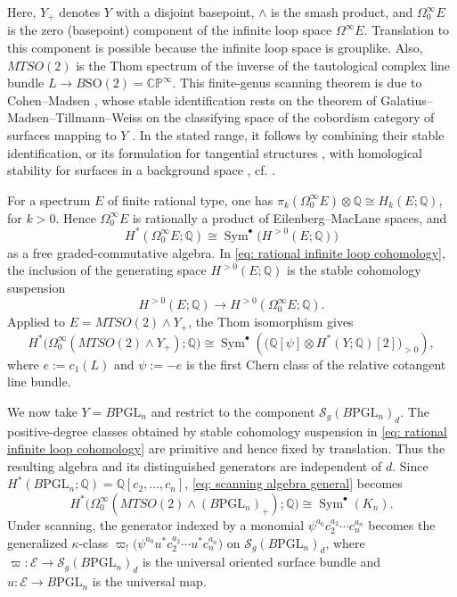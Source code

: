 \documentclass[11pt,reqno]{amsart}
\theoremstyle{plain} %
\theoremstyle{definition}
\newcommand{\QQ}{\mathbb{Q}}
\newcommand{\CC}{\mathbb{C}}
\newcommand{\PP}{\mathbb{P}}
\newcommand{\BPGL}{B\mathrm{PGL}}
\newcommand{\BSO}{B\mathrm{SO}}
\DeclareMathOperator{\Sym}{Sym}
\newcommand{\Sc}{\mathcal{S}}
\begin{document}
\noindent Here, $Y_+$ denotes $Y$ with a disjoint basepoint, $\wedge$ is the smash product, and $\Omega^\infty_0E$ is the zero (basepoint) component of the infinite loop space $\Omega^\infty E$. Translation to this component is possible because the infinite loop space is grouplike. Also, $MTSO(2)$ is the Thom spectrum of the inverse of the tautological complex line bundle $L \to \BSO(2)=\CC\PP^\infty$. This finite-genus scanning theorem is due to Cohen--Madsen \cite[Theorems~0.1 and~0.3]{cohen2006surfaces}, whose stable identification rests on the theorem of Galatius--Madsen--Tillmann--Weiss on the classifying space of the cobordism category of surfaces mapping to $Y$ \cite[\S 5]{GMTW}. In the stated range, it follows by combining their stable identification, or its formulation for tangential structures \cite[Corollary~F]{GRW-monoids}, with homological stability for surfaces in a background space \cite[\S 7.4]{RW-resolutions}, cf. \cite[Theorem~4.17]{boldsen}.

For a spectrum $E$ of finite rational type, one has $\pi_k(\Omega^\infty_0E)\otimes\QQ \cong H_k(E;\QQ)$, for $k > 0$. Hence $\Omega^\infty_0E$ is rationally a product of Eilenberg--MacLane spaces, and
\begin{equation} \label{eq: rational infinite loop cohomology}
H^*(\Omega^\infty_0E;\QQ) \cong \Sym^\bullet\big(H^{>0}(E;\QQ)\big)
\end{equation}
as a free graded-commutative algebra. In \eqref{eq: rational infinite loop cohomology}, the inclusion of the generating space $H^{>0}(E;\QQ)$ is the stable cohomology suspension
\[
H^{>0}(E;\QQ)\longrightarrow H^{>0}(\Omega^\infty_0E;\QQ).
\]
Applied to $E=MTSO(2)\wedge Y_+$, the Thom isomorphism gives
\begin{equation} \label{eq: scanning algebra general}
H^*\big(\Omega^\infty_0(MTSO(2)\wedge Y_+);\QQ\big)
\cong
\Sym^\bullet\!\left(\big(\QQ[\psi]\otimes H^*(Y;\QQ)[2]\big)_{>0}\right),
\end{equation}
where $e:=c_1(L)$ and $\psi:=-e$ is the first Chern class of the relative cotangent line bundle. 


We now take $Y=\BPGL_n$ and restrict to the component $\Sc_g(\BPGL_n)_d$. The positive-degree classes obtained by stable cohomology suspension in \eqref{eq: rational infinite loop cohomology} are primitive and hence fixed by translation. Thus the resulting algebra and its distinguished generators are independent of $d$. Since $H^*(\BPGL_n;\QQ)=\QQ[c_2,\dots,c_n]$, \eqref{eq: scanning algebra general} becomes
\begin{equation} \label{eq: scanning algebra PGL}
H^*\big(\Omega^\infty_0(MTSO(2)\wedge(\BPGL_n)_+);\QQ\big)
\cong \Sym^\bullet(K_n).
\end{equation}
Under scanning, the generator indexed by a monomial $\psi^{a_0}c_2^{a_2}\cdots c_n^{a_n}$ becomes the generalized $\kappa$-class $\varpi_!\big(\psi^{a_0}u^*c_2^{a_2}\cdots u^*c_n^{a_n}\big)$ 
on $\Sc_g(\BPGL_n)_d$, where $\varpi\colon\mathcal E\to\Sc_g(\BPGL_n)_d$ is the universal oriented surface bundle and $u\colon\mathcal E\to\BPGL_n$ is the universal map.
\end{document}

